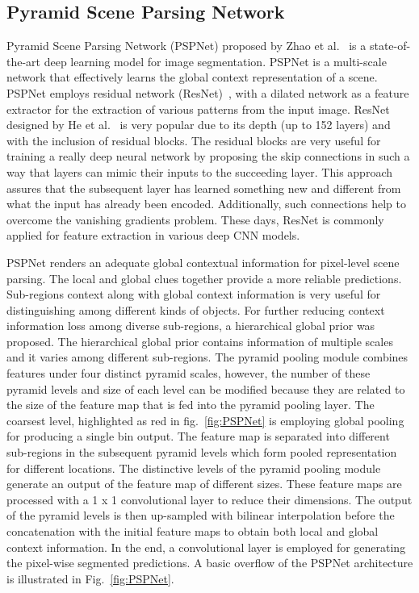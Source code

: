 \subsection{Pyramid Scene Parsing Network}
	Pyramid Scene Parsing Network (PSPNet) proposed by Zhao et al.~\cite{zhao2017pyramid} is a state-of-the-art deep learning model for image segmentation. PSPNet is a multi-scale network that effectively learns the global context representation of a scene. PSPNet employs residual network (ResNet)~\cite{he2016deep}, with a dilated network as a feature extractor for the extraction of various patterns from the input image. ResNet designed by He et al.~\cite{he2016deep} is very popular due to its depth (up to 152 layers) and with the inclusion of residual blocks. The residual blocks are very useful for training a really deep neural network by proposing the skip connections in such a way that layers can mimic their inputs to the succeeding layer. 
	This approach assures that the subsequent layer has learned something new and different from what the input has already been encoded. Additionally, such connections help to overcome the vanishing gradients problem. These days, ResNet is commonly applied for feature extraction in various deep CNN models. 
	
	PSPNet renders an adequate global contextual information for pixel-level scene parsing. The local and global clues together provide a more reliable predictions. Sub-regions context along with global context information is very useful for distinguishing among different kinds of objects. For further reducing context information loss among diverse sub-regions, a hierarchical global prior was proposed. The hierarchical global prior contains information of multiple scales and it varies among different sub-regions. The pyramid pooling module combines features under four distinct pyramid scales, however, the number of these pyramid levels and size of each level can be modified because they are related to the size of the feature map that is fed into the pyramid pooling layer. The coarsest level, highlighted as red in fig.~\ref{fig:PSPNet} is employing global pooling for producing a single bin output. The feature map is separated into different sub-regions in the subsequent pyramid levels which form pooled representation for different locations. The distinctive levels of the pyramid pooling module generate an output of the feature map of different sizes. These feature maps are processed with a 1 x 1 convolutional layer to reduce their dimensions. The output of the pyramid levels is then up-sampled with bilinear interpolation before the concatenation with the initial feature maps to obtain both local and global context information. In the end, a convolutional layer is employed for generating the pixel-wise segmented predictions. A basic overflow of the PSPNet architecture is illustrated in Fig.~\ref{fig:PSPNet}. 
	
